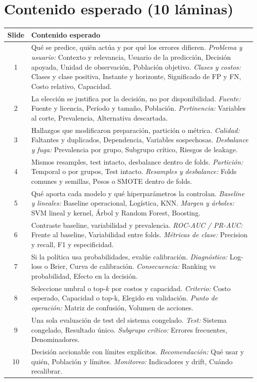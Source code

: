 \documentclass[11pt,letterpaper]{article}
\begin{document}
\section*{Contenido esperado (10 láminas)}
\begin{center}\small
\begin{tabular}{c p{13.2cm}}
\toprule
Slide & Contenido esperado \\
\midrule
1 & Qué se predice, quién actúa y por qué los errores difieren. \emph{Problema y usuario:} Contexto y relevancia, Usuario de la predicción, Decisión apoyada, Unidad de observación, Población objetivo. \emph{Clases y costos:} Clases y clase positiva, Instante y horizonte, Significado de FP y FN, Costo relativo, Capacidad. \\
2 & La elección se justifica por la decisión, no por disponibilidad. \emph{Fuente:} Fuente y licencia, Período y tamaño, Población. \emph{Pertinencia:} Variables al corte, Prevalencia, Alternativa descartada. \\
3 & Hallazgos que modificaron preparación, partición o métrica. \emph{Calidad:} Faltantes y duplicados, Dependencia, Variables sospechosas. \emph{Desbalance y fuga:} Prevalencia por grupo, Subgrupo crítico, Riesgos de leakage. \\
4 & Mismos resamples, test intacto, desbalance dentro de folds. \emph{Partición:} Temporal o por grupos, Test intacto. \emph{Resamples y desbalance:} Folds comunes y semillas, Pesos o SMOTE dentro de folds. \\
5 & Qué aporta cada modelo y qué hiperparámetros la controlan. \emph{Baseline y lineales:} Baseline operacional, Logística, KNN. \emph{Margen y árboles:} SVM lineal y kernel, Árbol y Random Forest, Boosting. \\
6 & Contraste baseline, variabilidad y prevalencia. \emph{ROC-AUC / PR-AUC:} Frente al baseline, Variabilidad entre folds. \emph{Métricas de clase:} Precision y recall, F1 y especificidad. \\
7 & Si la política usa probabilidades, evalúe calibración. \emph{Diagnóstico:} Log-loss o Brier, Curva de calibración. \emph{Consecuencia:} Ranking vs probabilidad, Efecto en la decisión. \\
8 & Seleccione umbral o top-$k$ por costos y capacidad. \emph{Criterio:} Costo esperado, Capacidad o top-k, Elegido en validación. \emph{Punto de operación:} Matriz de confusión, Volumen de acciones. \\
9 & Una sola evaluación de test del sistema congelado. \emph{Test:} Sistema congelado, Resultado único. \emph{Subgrupo crítico:} Errores frecuentes, Denominadores. \\
10 & Decisión accionable con límites explícitos. \emph{Recomendación:} Qué usar y quién, Población y límites. \emph{Monitoreo:} Indicadores y drift, Cuándo recalibrar. \\
\bottomrule
\end{tabular}\end{center}
\end{document}
